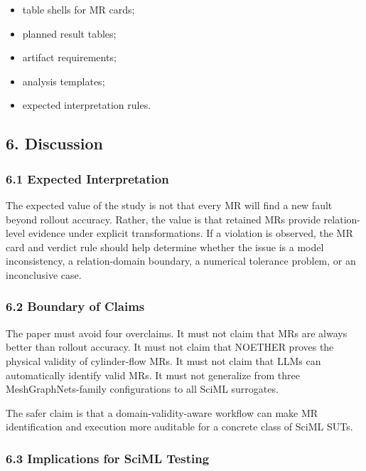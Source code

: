 \begin{itemize}
\tightlist
\item
  table shells for MR cards;
\item
  planned result tables;
\item
  artifact requirements;
\item
  analysis templates;
\item
  expected interpretation rules.
\end{itemize}

\subsection{6. Discussion}\label{discussion}

\subsubsection{6.1 Expected
Interpretation}\label{expected-interpretation}

The expected value of the study is not that every MR will find a new
fault beyond rollout accuracy. Rather, the value is that retained MRs
provide relation-level evidence under explicit transformations. If a
violation is observed, the MR card and verdict rule should help
determine whether the issue is a model inconsistency, a relation-domain
boundary, a numerical tolerance problem, or an inconclusive case.

\subsubsection{6.2 Boundary of Claims}\label{boundary-of-claims}

The paper must avoid four overclaims. It must not claim that MRs are
always better than rollout accuracy. It must not claim that NOETHER
proves the physical validity of cylinder-flow MRs. It must not claim
that LLMs can automatically identify valid MRs. It must not generalize
from three MeshGraphNets-family configurations to all SciML surrogates.

The safer claim is that a domain-validity-aware workflow can make MR
identification and execution more auditable for a concrete class of
SciML SUTs.

\subsubsection{6.3 Implications for SciML
Testing}\label{implications-for-sciml-testing}

